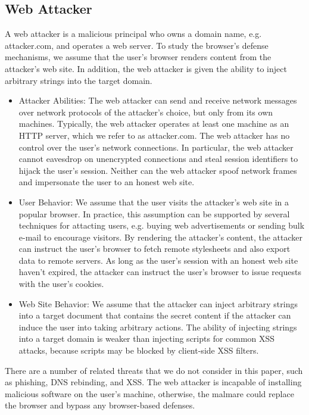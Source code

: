 \documentclass{acm_proc_article-sp}
\begin{document}
\subsection*{Web Attacker}
A web attacker is a malicious principal who owns a domain name, e.g. attacker.com, and operates a web server. To study the browser's defense mechanisms, we assume that the user's browser renders content from the attacker's web site. In addition, the web attacker is given the ability to inject arbitrary strings into the target domain.

\begin{itemize}

\item{Attacker Abilities:}
The web attacker can send and receive network messages over network protocols of the attacker's choice, but only from its own machines. Typically, the web attacker operates at least one machine as an HTTP server, which we refer to as attacker.com. The web attacker has no control over the user's network connections. In particular, the web attacker cannot eavesdrop on unencrypted connections and steal session identifiers to hijack the user's session. Neither can the web attacker spoof network frames and impersonate the user to an honest web site.

\item{User Behavior:}
We assume that the user visits the attacker's web site in a popular browser. In practice, this assumption can be supported by several techniques for attacting users, e.g. buying web advertisements or sending bulk e-mail to encourage visitors. By rendering the attacker's content, the attacker can instruct the user's browser to fetch remote stylesheets and also export data to remote servers. As long as the user's session with an honest web site haven't expired, the attacker can instruct the user's browser to issue requests with the user's cookies.

\item{Web Site Behavior:}
We assume that the attacker can inject arbitrary strings into a target document that contains the secret content if the attacker can induce the user into taking arbitrary actions. The ability of injecting strings into a target domain is weaker than injecting scripts for common XSS attacks, because scripts may be blocked by client-side XSS filters.

\end{itemize}
There are a number of related threats that we do not consider in this paper, such as phishing, DNS rebinding, and XSS. The web attacker is incapable of installing malicious software on the user's machine, otherwise, the malmare could replace the browser and bypass any browser-based defenses.
\end{document}
